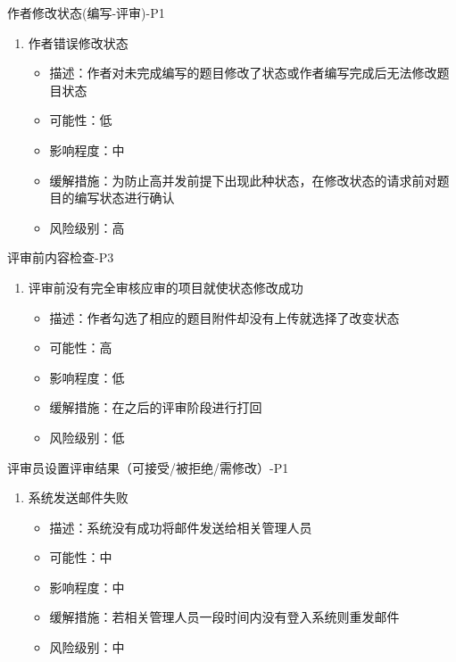 \documentclass[hyperref, a4paper]{ctexart}
\providecommand{\tightlist}{%
  \setlength{\itemsep}{0pt}\setlength{\parskip}{0pt}}
\begin{document}
作者修改状态(编写-评审)-P1

\begin{enumerate}
\def\labelenumi{\arabic{enumi}.}
\tightlist
\item
  作者错误修改状态

  \begin{itemize}
  \tightlist
  \item
    描述：作者对未完成编写的题目修改了状态或作者编写完成后无法修改题目状态
  \item
    可能性：低
  \item
    影响程度：中
  \item
    缓解措施：为防止高并发前提下出现此种状态，在修改状态的请求前对题目的编写状态进行确认
  \item
    风险级别：高
  \end{itemize}
\end{enumerate}

评审前内容检查-P3

\begin{enumerate}
\def\labelenumi{\arabic{enumi}.}
\tightlist
\item
  评审前没有完全审核应审的项目就使状态修改成功

  \begin{itemize}
  \tightlist
  \item
    描述：作者勾选了相应的题目附件却没有上传就选择了改变状态
  \item
    可能性：高
  \item
    影响程度：低
  \item
    缓解措施：在之后的评审阶段进行打回
  \item
    风险级别：低
  \end{itemize}
\end{enumerate}

评审员设置评审结果（可接受/被拒绝/需修改）-P1

\begin{enumerate}
\def\labelenumi{\arabic{enumi}.}
\tightlist
\item
  系统发送邮件失败

  \begin{itemize}
  \tightlist
  \item
    描述：系统没有成功将邮件发送给相关管理人员
  \item
    可能性：中
  \item
    影响程度：中
  \item
    缓解措施：若相关管理人员一段时间内没有登入系统则重发邮件
  \item
    风险级别：中
  \end{itemize}
\end{enumerate}
\end{document}
